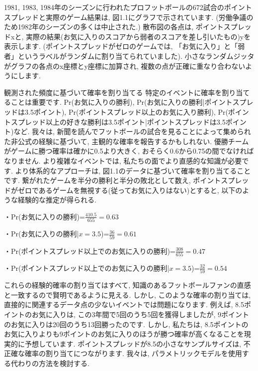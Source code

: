 \documentclass[10pt,dvipdfmx,a4]{beamer}
\begin{document}

\begin{frame}
1981, 1983, 1984年のシーズンに行われたプロフットボールの672試合のポイントスプレッドと実際のゲーム結果は, 図1.1にグラフで示されています.
(労働争議のため1982年のシーズンの多くは中止された.)
散布図の各点は, ポイントスプレッドxと, 実際の結果(お気に入りのスコアから弱者のスコアを差し引いたもの)yを表示します.
(ポイントスプレッドがゼロのゲームでは, 「お気に入り」と「弱者」というラベルがランダムに割り当てられていました).
小さなランダムジッタがグラフの各点のx座標とy座標に加算され, 複数の点が正確に重なり合わないようにします.
\end{frame}


\begin{frame}{観測された頻度に基づいて確率を割り当てる}
特定のイベントに確率を割り当てることは重要です.
$\text{Pr}$(お気に入りの勝利), $\text{Pr}$(お気に入りの勝利|ポイントスプレッドは3.5ポイント), $\text{Pr}$(ポイントスプレッド以上のお気に入り勝利), $\text{Pr}$(ポイントスプレッド以上の好きな勝利は3.5ポイント|ポイントスプレッドは3.5ポイント)など.
我々は, 新聞を読んでフットボールの試合を見ることによって集められた非公式の経験に基づいて, 主観的な確率を報告するかもしれない.
優勝チームがゲームに勝つ確率は確かに0.5より大きく, おそらく0.6から0.75の間でなければなりません.
より複雑なイベントでは, 私たちの面でより直感的な知識が必要です.
より体系的なアプローチは, 図1.1のデータに基づいて確率を割り当てることです.
繋がれたゲームを半分の勝利と半分の敗北として数え, ポイントスプレッドがゼロであるゲームを無視する(従ってお気に入りはない)とすると, 以下のような経験的な推定が得られる.

・$\text{Pr}$(お気に入りの勝利)=$\tfrac{410.5}{655}=0.63$

・$\text{Pr}$(お気に入りの勝利|$x=3.5$)=$\tfrac{36}{59}=0.61$

・$\text{Pr}$(ポイントスプレッド以上でのお気に入りの勝利)=$\tfrac{308}{655}=0.47$

・$\text{Pr}$(ポイントスプレッド以上でのお気に入りの勝利|$x=3.5$)=$\tfrac{32}{59}=0.54$
\end{frame}


\begin{frame}
これらの経験的確率の割り当てはすべて, 知識のあるフットボールファンの直感と一致するので賢明であるように見える.
しかし, このような確率の割り当ては, 直接的に関連するデータ点の少ないイベントでは問題になります.
例えば, 8.5ポイントのお気に入りは, この3年間で5回のうち5回を獲得しましたが, 9ポイントのお気に入りは20回のうち13回勝ったのです.
しかし, 私たちは, 8.5ポイントのお気に入りよりも9ポイントのお気に入りのほうが勝つ確率が高くなることを現実的に予想しています.
ポイントスプレッドが8.5の小さなサンプルサイズは, 不正確な確率の割り当てにつながります.
我々は, パラメトリックモデルを使用する代わりの方法を検討する.
\end{frame}
\end{document}
